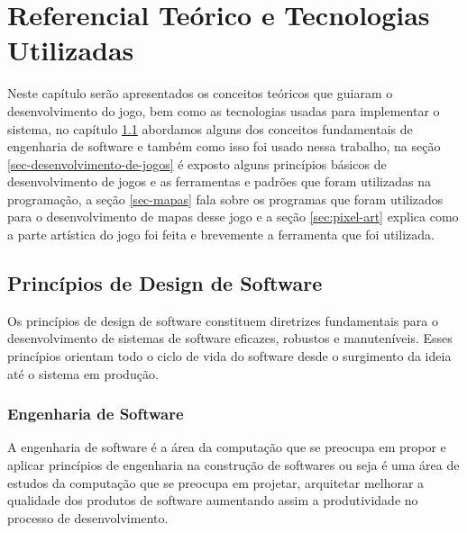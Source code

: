 \chapter{Referencial Teórico e Tecnologias Utilizadas}
\label{sec-referencial}
Neste capítulo serão apresentados os conceitos teóricos que guiaram o desenvolvimento do jogo, bem como as tecnologias usadas para implementar o sistema, no capítulo \ref{sec-principios-de-design-de-software} abordamos alguns dos conceitos fundamentais de engenharia de software e também como isso foi usado nessa trabalho, na seção \ref{sec-desenvolvimento-de-jogos} é exposto alguns princípios básicos de desenvolvimento de jogos e as ferramentas e padrões que foram utilizadas na programação, a seção \ref{sec-mapas} fala sobre os programas que foram utilizados para o desenvolvimento de mapas desse jogo e a seção \ref{sec:pixel-art} explica como a parte artística do jogo foi feita e brevemente a ferramenta que foi utilizada.

\section{Princípios de Design de Software}
\label{sec-principios-de-design-de-software}
Os princípios de design de software constituem diretrizes fundamentais para o desenvolvimento de sistemas de software eficazes, robustos e manuteníveis. Esses princípios orientam todo o ciclo de vida do software desde o surgimento da ideia até o sistema em produção. 
\subsection{Engenharia de Software}
\label{sec:engenharia-de-software}
A engenharia de software é a área da computação que se preocupa em propor e aplicar princípios de engenharia na construção de softwares\cite{engsoftmoderna} ou seja é uma área de estudos da computação que se preocupa em projetar, arquitetar melhorar a qualidade dos produtos de software aumentando assim a produtividade no processo de desenvolvimento. 


